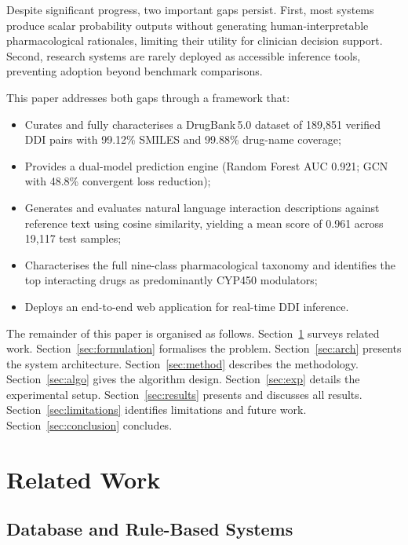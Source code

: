 \documentclass[conference]{IEEEtran}
\begin{document}
Despite significant progress, two important gaps persist. First, most systems produce scalar
probability outputs without generating human-interpretable pharmacological rationales,
limiting their utility for clinician decision support. Second, research systems are rarely
deployed as accessible inference tools, preventing adoption beyond benchmark comparisons.

This paper addresses both gaps through a framework that:
\begin{itemize}
  \item Curates and fully characterises a DrugBank\,5.0 dataset of 189,851 verified
  DDI pairs with 99.12\% SMILES and 99.88\% drug-name coverage;
  \item Provides a dual-model prediction engine (Random Forest AUC 0.921; GCN with
  48.8\% convergent loss reduction);
  \item Generates and evaluates natural language interaction descriptions against reference
  text using cosine similarity, yielding a mean score of 0.961 across 19,117 test samples;
  \item Characterises the full nine-class pharmacological taxonomy and identifies the top
  interacting drugs as predominantly CYP450 modulators;
  \item Deploys an end-to-end web application for real-time DDI inference.
\end{itemize}

The remainder of this paper is organised as follows. Section~\ref{sec:related} surveys
related work. Section~\ref{sec:formulation} formalises the problem. Section~\ref{sec:arch}
presents the system architecture. Section~\ref{sec:method} describes the methodology.
Section~\ref{sec:algo} gives the algorithm design. Section~\ref{sec:exp} details the
experimental setup. Section~\ref{sec:results} presents and discusses all results.
Section~\ref{sec:limitations} identifies limitations and future work.
Section~\ref{sec:conclusion} concludes.

\section{Related Work}
\label{sec:related}

\subsection{Database and Rule-Based Systems}
\end{document}
